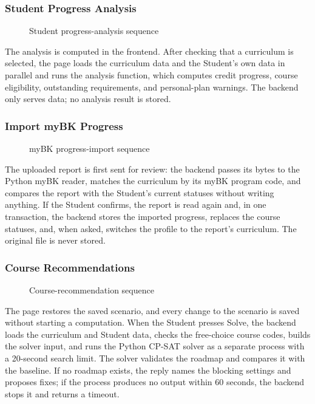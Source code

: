 \subsubsection{Student Progress Analysis}
\begin{figure}[H]
    \centering
    
    \caption{Student progress-analysis sequence}
\end{figure}
The analysis is computed in the frontend. After checking that a curriculum is selected, the page loads the curriculum data and the Student's own data in parallel and runs the analysis function, which computes credit progress, course eligibility, outstanding requirements, and personal-plan warnings. The backend only serves data; no analysis result is stored.

\subsubsection{Import myBK Progress}
\begin{figure}[H]
    \centering
    
    \caption{myBK progress-import sequence}
\end{figure}
The uploaded report is first sent for review: the backend passes its bytes to the Python myBK reader, matches the curriculum by its myBK program code, and compares the report with the Student's current statuses without writing anything. If the Student confirms, the report is read again and, in one transaction, the backend stores the imported progress, replaces the course statuses, and, when asked, switches the profile to the report's curriculum. The original file is never stored.

\subsubsection{Course Recommendations}
\begin{figure}[H]
    \centering
    
    \caption{Course-recommendation sequence}
\end{figure}
The page restores the saved scenario, and every change to the scenario is saved without starting a computation. When the Student presses Solve, the backend loads the curriculum and Student data, checks the free-choice course codes, builds the solver input, and runs the Python CP-SAT solver as a separate process with a 20-second search limit. The solver validates the roadmap and compares it with the baseline. If no roadmap exists, the reply names the blocking settings and proposes fixes; if the process produces no output within 60 seconds, the backend stops it and returns a timeout.

